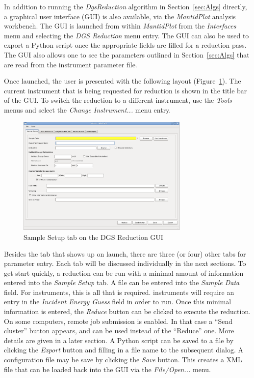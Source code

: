 In addition to running the \textit{DgsReduction} algorithm in Section~\ref{sec:Algs} directly, a graphical user interface (GUI) is also available, via the \textit{MantidPlot} analysis workbench. The GUI is launched from within \textit{MantidPlot} from the \textit{Interfaces} menu and selecting the \textit{DGS Reduction} menu entry. The GUI can also be used to export a Python script once the appropriate fields are filled for a reduction pass. The GUI also allows one to see the parameters outlined in Section~\ref{sec:Algs} that are read from the instrument parameter file. 

Once launched, the user is presented with the following layout (Figure~\ref{fig:SamSet}). The current instrument that is being requested for reduction is shown in the title bar of the GUI. To switch the reduction to a different instrument, use the \textit{Tools} menus and select the \textit{Change Instrument...} menu entry. 
\begin{figure}[ht]
\centerline{\includegraphics[width=0.75\textwidth]{figures/SampleSetup.png}}
\caption{Sample Setup tab on the DGS Reduction GUI}
\label{fig:SamSet}
\end{figure}
Besides the tab that shows up on launch, there are three (or four) other tabs for parameter entry. Each tab will be discussed individually in the next sections. To get start quickly, a reduction can be run with a minimal amount of information entered into the \textit{Sample Setup} tab. A file can be entered into the \textit{Sample Data} field. For \sns{} instruments, this is all that is required. \isis{} instruments will require an entry in the \textit{Incident Energy Guess} field in order to run. Once this minimal information is entered, the \textit{Reduce} button can be clicked to execute the reduction. On some computers, remote job submission is enabled. In that case a ``Send cluster'' button appears, and can be used instead of the ``Reduce'' one. More details are given in a later section. A Python script can be saved to a file by clicking the \textit{Export} button and filling in a file name to the subsequent dialog. A configuration file may be save by clicking the \textit{Save} button. This creates a XML file that can be loaded back into the GUI via the \textit{File/Open...} menu.
